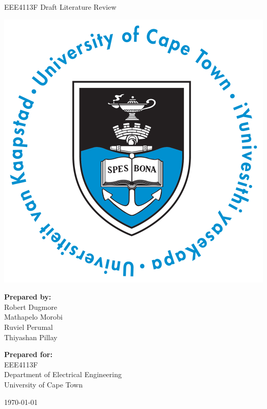 \thispagestyle{empty}
\begin{center}
    
\Huge

\vspace{5cm}

EEE4113F Draft Literature Review

\vspace{2.5cm}

\includegraphics[width=0.4\linewidth]{FrontMatter/UCT_logo.png}

\vfill

\large
\textbf{Prepared by:}\\
Robert Dugmore\\
Mathapelo Morobi\\
Ruviel Perumal\\
Thiyashan Pillay

\vspace{1cm}

\textbf{Prepared for:}\\
EEE4113F\\
Department of Electrical Engineering\\
University of Cape Town

\vspace{2cm}

\today


\end{center}